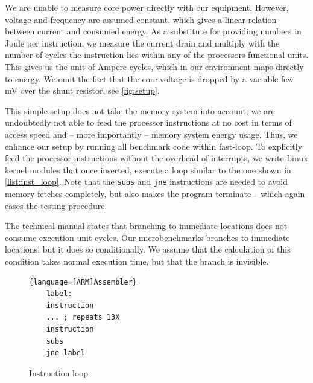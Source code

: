 We are unable to measure core power directly with our equipment. However,
voltage and frequency are assumed constant, which gives a linear relation
between current and consumed energy. As a substitute for providing numbers in
Joule per instruction, we measure the current drain and multiply with the number
of cycles the instruction lies within any of the processors functional units.
This gives us the unit of Ampere-cycles, which in our environment maps directly
to energy.  We omit the fact that the core voltage is dropped by a variable few mV over
the shunt resistor, see \autoref{fig:setup}.

This simple setup does not take the memory system into account; we are
undoubtedly not able to feed the processor instructions at no cost in terms of
access speed and -- more importantly -- memory system energy usage. Thus, we
enhance our setup by running all benchmark code within fast-loop. To explicitly
feed the processor instructions without the overhead of interrupts, we write
Linux kernel modules that once inserted, execute a loop similar to the one shown
in \autoref{list:inst_loop}. Note that the \texttt{subs} and \texttt{jne}
instructions are needed to avoid memory fetches completely, but also makes the
program terminate -- which again eases the testing procedure.

The technical manual states that branching to immediate locations
does not consume execution unit cycles. Our microbenchmarks branches to
immediate locations, but it does so conditionally. We assume that the
calculation of this condition takes normal execution time, but that the branch
is invisible.

\begin{figure}
    \begin{lstlisting}{language=[ARM]Assembler}
    label:
    instruction
    ... ; repeats 13X
    instruction
    subs
    jne label
    \end{lstlisting}
    \caption{Instruction loop}
    \label{list:inst_loop}
\end{figure}

